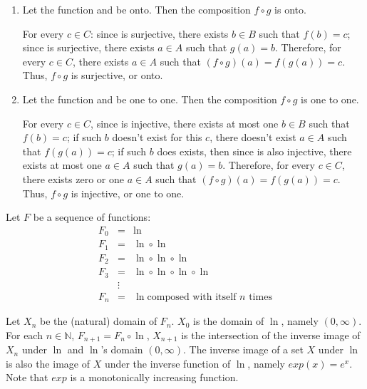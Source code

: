 \documentclass{article}
\begin{document}
\begin{enumerate}
\item Let the function  and  be onto. Then the composition $f \circ g$ is onto. 

\Proof{} For every $c \in C$: since  is surjective, there exists $b \in B$ such that $f(b) = c$; since  is surjective, there exists $a \in A$ such that $g(a) = b$. Therefore, for every $c \in C$, there exists $a \in A$ such that $(f \circ g)(a) = f(g(a)) = c$. Thus, $f \circ g$ is surjective, or onto. \QED

\item Let the function  and  be one to one. Then the composition $f \circ g$ is one to one. 

\Proof{} For every $c \in C$, since  is injective, there exists at most one $b \in B$ such that $f(b) = c$; if such $b$ doesn't exist for this $c$, there doesn't exist $a \in A$ such that $f(g(a)) = c$; if such $b$ does exists, then since  is also injective, there exists at most one $a \in A$ such that $g(a) = b$. Therefore, for every $c \in C$, there exists zero or one $a \in A$ such that $(f \circ g)(a) = f(g(a)) = c$. Thus, $f \circ g$ is injective, or one to one. \QED
\end{enumerate}

Let $F$ be a sequence of functions:
$$\begin{array}{rcl}
F_0 &=& \ln \\
F_1 &=& \ln \circ \ln \\
F_2 &=& \ln \circ \ln \circ \ln \\
F_3 &=& \ln \circ \ln \circ \ln \circ \ln \\
&\vdots& \\
F_n &=& \ln \text{composed with itself $n$ times}
\end{array}$$

Let $X_n$ be the (natural) domain of $F_{n}$. $X_{0}$ is the domain of $\ln$, namely $(0, \infty)$. For each $n \in \mathbb{N}$, $F_{n+1} = F_n \circ \ln$, $X_{n+1}$ is the intersection of the inverse image of $X_n$ under $\ln$ and $\ln$'s domain $(0, \infty)$. The inverse image of a set $X$ under $\ln$ is also the image of $X$ under the inverse function of $\ln$, namely $exp(x) = e^x$. Note that $exp$ is a monotonically increasing function.
\end{document}
